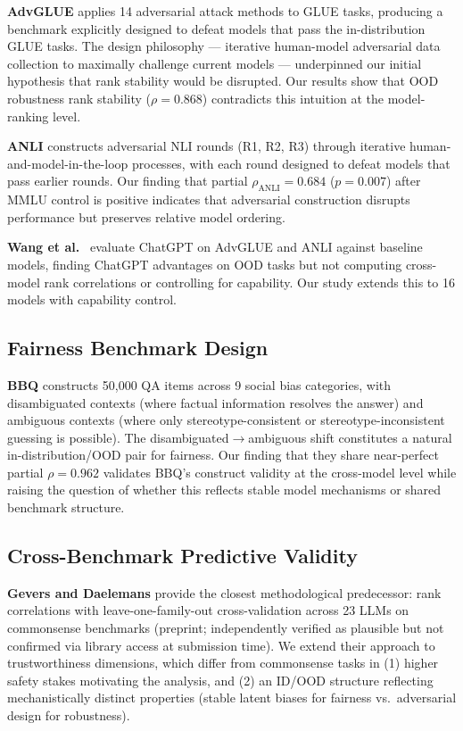 \textbf{AdvGLUE} \citep{Wang2021AdvGLUE} applies 14 adversarial attack methods to GLUE tasks, producing a benchmark explicitly designed to defeat models that pass the in-distribution GLUE tasks. The design philosophy --- iterative human-model adversarial data collection to maximally challenge current models --- underpinned our initial hypothesis that rank stability would be disrupted. Our results show that OOD robustness rank stability ($\rho = 0.868$) contradicts this intuition at the model-ranking level.

\textbf{ANLI} \citep{Nie2020Adversarial} constructs adversarial NLI rounds (R1, R2, R3) through iterative human-and-model-in-the-loop processes, with each round designed to defeat models that pass earlier rounds. Our finding that partial $\rho_{\text{ANLI}} = 0.684$ ($p = 0.007$) after MMLU control is positive indicates that adversarial construction disrupts performance but preserves relative model ordering.

\textbf{Wang et al.}\ \citep{Wang2023Robustness} evaluate ChatGPT on AdvGLUE and ANLI against baseline models, finding ChatGPT advantages on OOD tasks but not computing cross-model rank correlations or controlling for capability. Our study extends this to 16 models with capability control.

\subsection{Fairness Benchmark Design}

\textbf{BBQ} \citep{Parrish2022BBQ} constructs 50,000 QA items across 9 social bias categories, with disambiguated contexts (where factual information resolves the answer) and ambiguous contexts (where only stereotype-consistent or stereotype-inconsistent guessing is possible). The disambiguated$\rightarrow$ambiguous shift constitutes a natural in-distribution/OOD pair for fairness. Our finding that they share near-perfect partial $\rho = 0.962$ validates BBQ's construct validity at the cross-model level while raising the question of whether this reflects stable model mechanisms or shared benchmark structure.

\subsection{Cross-Benchmark Predictive Validity}

\textbf{Gevers and Daelemans} \citep{GeversAndDaelemans2026} provide the closest methodological predecessor: rank correlations with leave-one-family-out cross-validation across 23 LLMs on commonsense benchmarks (preprint; independently verified as plausible but not confirmed via library access at submission time). We extend their approach to trustworthiness dimensions, which differ from commonsense tasks in (1) higher safety stakes motivating the analysis, and (2) an ID/OOD structure reflecting mechanistically distinct properties (stable latent biases for fairness vs.\ adversarial design for robustness).

